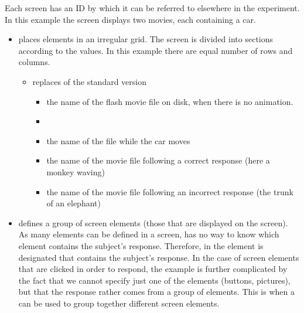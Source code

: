  Each screen has an ID by which it can be referred
to elsewhere in the experiment. In this example the screen
displays two movies, each containing a car.

\begin{itemize}
\item {} places elements in an irregular grid.
The screen is divided into sections according to the values. In
this example there are equal number of rows and columns.

\begin{itemize}
\item {} replaces  of the standard
version

\begin{itemize}
\item {} the name of the flash movie file on disk,
when there is no animation.

\item {}


\item {}the name of the file while the car moves

\item {} the name of the movie file following a
correct response (here a monkey waving)

\item {} the name of the movie file following an
incorrect response  (the trunk of an elephant)

\end{itemize}

\end{itemize}

\item {} defines a group of screen elements
(those that are displayed on the screen). As many elements can be
defined in a screen, \apex has no way to know which element
contains the subject's response. Therefore, in
 the element is designated that
contains the subject's response. In the case of screen elements
that are clicked in order to respond, the example is further
complicated by the fact that we cannot specify just one of the
elements (buttons, pictures), but that the response rather comes
from a group of elements. This is when a  can
be used to group together different screen elements.


\end{itemize}

